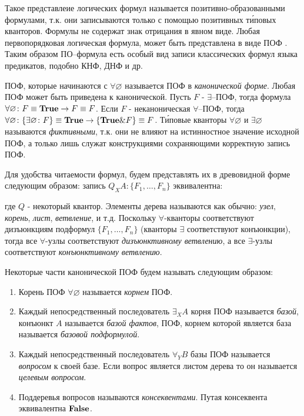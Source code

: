 \documentclass[a4paper]{jctart15b}
\begin{document}
Такое представлеие логических формул называется позитивно-образованными формулами, т.к. они записываются только с помощью позитивных т\'иповых кванторов. Формулы не содержат знак отрицания в явном виде. Любая первопорядковая логическая формула, может быть представлена в виде ПОФ \cite{ICDS2000}. Таким образом ПО--формула есть особый вид записи классических формул языка предикатов, подобно КНФ, ДНФ и др.

ПОФ, которые начинаются с $\forall \varnothing$ называется ПОФ в {\em канонической форме}. Любая ПОФ может быть приведена к канонической. Пусть $F$ - $\exists$--ПОФ, тогда формула $\forall \varnothing\colon F \equiv \text{\textbf{True}} \rightarrow F \equiv F$. Если $F$ - неканоническая $\forall$--ПОФ, тогда $\forall \varnothing\colon\{\exists \varnothing\colon F\} \equiv \text{\textbf{True}} \rightarrow \{\text{\textbf{True}}\&F\} \equiv F$. Т\'иповые кванторы $\forall \varnothing$ и $\exists \varnothing$ называются {\em фиктивными}, т.к. они не влияют на истинностное значение исходной ПОФ, а только лишь служат конструкциями сохраняющими корректную запись ПОФ.

Для удобства читаемости формул, будем представлять их в древовидной форме следующим образом: запись $Q_XA\colon\{F_1,\ldots,F_n\}$ эквивалентна:
\begin{center}
\end{center}
\noindent где $Q$ - некоторый квантор. Элементы дерева называются как обычно: \emph{узел}, \emph{корень}, \emph{лист}, \emph{ветвление}, и т.д. Поскольку $\forall$-кванторы соответствуют дизъюнкциям подформул $\{F_1,\ldots,F_n\}$ (кванторы $\exists$ соответствуют конъюнкции), тогда все $\forall$-узлы соответствуют {\em дизъюнктивному ветвлению}, а все $\exists$-узлы соответствуют {\em конъюнктивному ветвлению}.

Некоторые части канонической ПОФ будем называть следующим образом:
\begin{enumerate}
\item Корень ПОФ $\forall \varnothing$ называется {\em корнем} ПОФ.
\item Каждый непосредственный последователь $\exists_XA$ корня ПОФ называется {\em базой}, конъюнкт $A$ называется {\em базой фактов}, ПОФ, корнем которой является база называется {\em базовой подформулой}.
\item Каждый непосредственный последователь $\forall_YB$ базы ПОФ называется {\em вопросом} к своей базе. Если вопрос является листом дерева то он называется {\em целевым вопросом}.
\item Поддеревья вопросов называются {\em консеквентами}. Путая консеквента эквивалентна $\text{\textbf{False}}$.
\end{enumerate}
\end{document}
